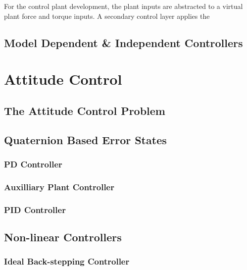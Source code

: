 For the control plant development, the plant inputs are abstracted to a virtual plant force and torque inputs. A secondary control layer applies the 
\subsection*{Model Dependent \& Independent Controllers}

\section{Attitude Control}
\label{sec:control.attitude}
\subsection{The Attitude Control Problem}
\label{subsec:control.attitude.problem}
\subsection{Quaternion Based Error States}
\label{subsec:control.attitude.quaternion}
\subsubsection{PD Controller}
\subsubsection{Auxilliary Plant Controller}
\subsubsection{PID Controller}
\subsection{Non-linear Controllers}
\label{subsec:control.attitude.nonlinear}
\subsubsection{Ideal Back-stepping Controller}
